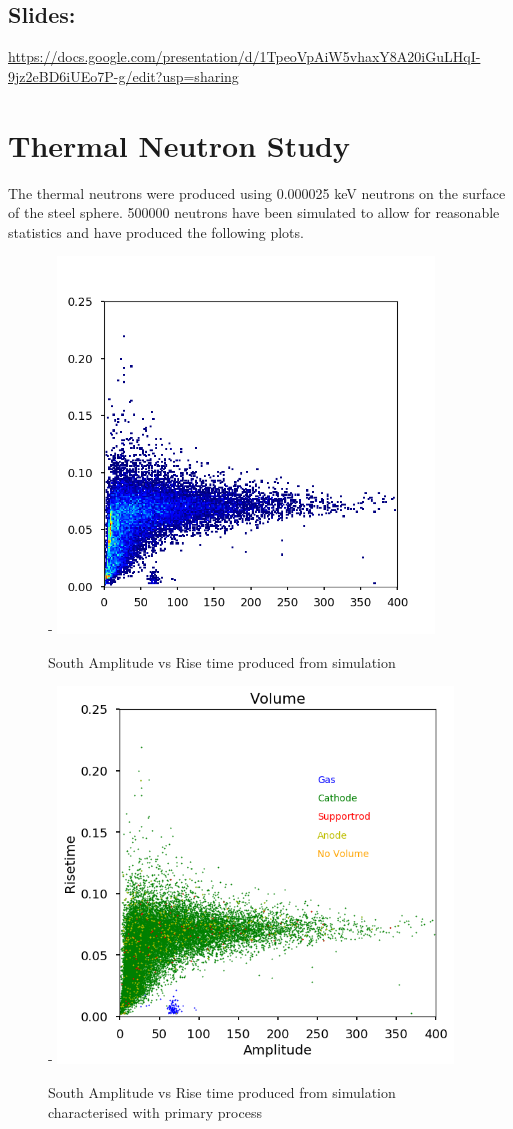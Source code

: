 \documentclass[a4paper]{article}
\begin{document}
\subsection{Slides:}
\url{https://docs.google.com/presentation/d/1TpeoVpAiW5vhaxY8A20iGuLHqI-9jz2eBD6iUEo7P-g/edit?usp=sharing}
\section{Thermal Neutron Study}
The thermal neutrons were produced using 0.000025 keV neutrons on the surface of the steel sphere. 500000 neutrons have been simulated to allow for reasonable statistics and have produced the following plots.
\begin{figure}[H]-
        \centering
        \includegraphics[height=10cm]{steel_achinos-2d.png}
        \caption{South Amplitude vs Rise time produced from simulation }
        \label{fig:south2d}
        \end{figure}
\begin{figure}[H]-
        \centering
        \includegraphics[height=10cm]{steel_achinos_vol_38.png}
        \caption{South Amplitude vs Rise time produced from simulation characterised with primary process}
        \label{fig:south2dpp}
        \end{figure}
\end{document}
